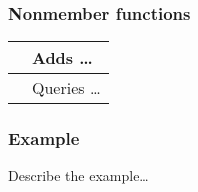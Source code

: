 \documentclass[letterpaper,10pt,english]{sphinxmanual}
\begin{document}
\subsubsection*{Non\sphinxhyphen{}member functions}


\begin{savenotes}\sphinxattablestart
\centering
\begin{tabulary}{\linewidth}[t]{|T|T|}
\hline

{\hyperref[\detokenize{style-guide/ClassExample:operator}]{}}
&
Adds …
\\
\hline
{\hyperref[\detokenize{style-guide/ClassExample:fun3}]{}}
&
Queries …
\\
\hline
\end{tabulary}
\par
\sphinxattableend\end{savenotes}
\subsubsection*{Example}

Describe the example…
\end{document}

